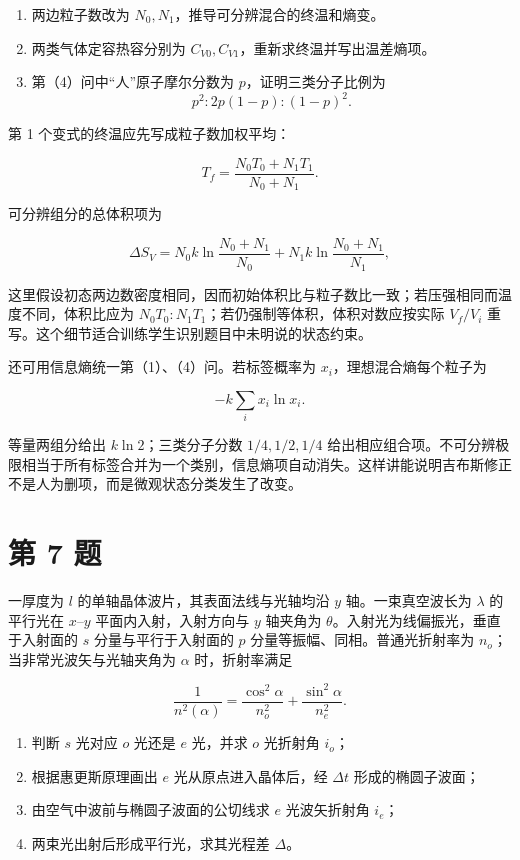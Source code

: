 \documentclass[12pt,a4paper,UTF8]{ctexart}
\newcommand{\tightlist}{\setlength{\itemsep}{0pt}\setlength{\parskip}{0pt}}
\begin{document}
\begin{enumerate}
\def\labelenumi{\arabic{enumi}.}
\tightlist
\item
  两边粒子数改为 \(N_0,N_1\)，推导可分辨混合的终温和熵变。
\item
  两类气体定容热容分别为 \(C_{V0},C_{V1}\)，重新求终温并写出温差熵项。
\item
  第（4）问中``人''原子摩尔分数为 \(p\)，证明三类分子比例为
  \[p^2:2p(1-p):(1-p)^2.\]
\end{enumerate}

第 1 个变式的终温应先写成粒子数加权平均：

\[T_f=\frac{N_0T_0+N_1T_1}{N_0+N_1}.\]

可分辨组分的总体积项为

\[\Delta S_V
=N_0k\ln\frac{N_0+N_1}{N_0}
+N_1k\ln\frac{N_0+N_1}{N_1},\]

这里假设初态两边数密度相同，因而初始体积比与粒子数比一致；若压强相同而温度不同，体积比应为
\(N_0T_0:N_1T_1\)；若仍强制等体积，体积对数应按实际 \(V_f/V_i\)
重写。这个细节适合训练学生识别题目中未明说的状态约束。

还可用信息熵统一第（1）、（4）问。若标签概率为
\(x_i\)，理想混合熵每个粒子为

\[-k\sum_i x_i\ln x_i.\]

等量两组分给出 \(k\ln2\)；三类分子分数 \(1/4,1/2,1/4\)
给出相应组合项。不可分辨极限相当于所有标签合并为一个类别，信息熵项自动消失。这样讲能说明吉布斯修正不是人为删项，而是微观状态分类发生了改变。

\newpage

\section{第 7 题}\label{ux7b2c-7-ux9898}

一厚度为 \(l\) 的单轴晶体波片，其表面法线与光轴均沿 \(y\)
轴。一束真空波长为 \(\lambda\) 的平行光在 \(x\)--\(y\)
平面内入射，入射方向与 \(y\) 轴夹角为
\(\theta\)。入射光为线偏振光，垂直于入射面的 \(s\) 分量与平行于入射面的
\(p\) 分量等振幅、同相。普通光折射率为 \(n_o\)；当非常光波矢与光轴夹角为
\(\alpha\) 时，折射率满足

\[\frac1{n^2(\alpha)}=\frac{\cos^2\alpha}{n_o^2}+\frac{\sin^2\alpha}{n_e^2}.\]

\begin{enumerate}
\def\labelenumi{\arabic{enumi}.}
\tightlist
\item
  判断 \(s\) 光对应 \(o\) 光还是 \(e\) 光，并求 \(o\) 光折射角 \(i_o\)；
\item
  根据惠更斯原理画出 \(e\) 光从原点进入晶体后，经 \(\Delta t\)
  形成的椭圆子波面；
\item
  由空气中波前与椭圆子波面的公切线求 \(e\) 光波矢折射角 \(i_e\)；
\item
  两束光出射后形成平行光，求其光程差 \(\Delta\)。
\end{enumerate}
\end{document}
